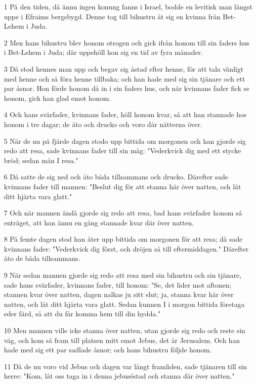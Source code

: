 \par 1 På den tiden, då ännu ingen konung fanns i Israel, bodde en levitisk man längst uppe i Efraims bergsbygd. Denne tog till bihustru åt sig en kvinna från Bet-Lehem i Juda.
\par 2 Men hans bihustru blev honom otrogen och gick ifrån honom till sin faders hus i Bet-Lehem i Juda; där uppehöll hon sig en tid av fyra månader.
\par 3 Då stod hennes man upp och begav sig åstad efter henne, för att tala vänligt med henne och så föra henne tillbaka; och han hade med sig sin tjänare och ett par åsnor. Hon förde honom då in i sin faders hus, och när kvinnans fader fick se honom, gick han glad emot honom.
\par 4 Och hans svärfader, kvinnans fader, höll honom kvar, så att han stannade hos honom i tre dagar; de åto och drucko och voro där nätterna över.
\par 5 När de nu på fjärde dagen stodo upp bittida om morgonen och han gjorde sig redo att resa, sade kvinnans fader till sin måg: "Vederkvick dig med ett stycke bröd; sedan mån I resa."
\par 6 Då satte de sig ned och åto båda tillsammans och drucko. Därefter sade kvinnans fader till mannen: "Beslut dig för att stanna här över natten, och låt ditt hjärta vara glatt."
\par 7 Och när mannen ändå gjorde sig redo att resa, bad hans svärfader honom så enträget, att han ännu en gång stannade kvar där över natten.
\par 8 På femte dagen stod han åter upp bittida om morgonen för att resa; då sade kvinnans fader: "Vederkvick dig först, och dröjen så till eftermiddagen." Därefter åto de båda tillsammans.
\par 9 När sedan mannen gjorde sig redo att resa med sin bihustru och sin tjänare, sade hans svärfader, kvinnans fader, till honom: "Se, det lider mot aftonen; stannen kvar över natten, dagen nalkas ju sitt slut; ja, stanna kvar här över natten, och låt ditt hjärta vara glatt. Sedan kunnen I i morgon bittida företaga eder färd, så att du får komma hem till din hydda."
\par 10 Men mannen ville icke stanna över natten, utan gjorde sig redo och reste sin väg, och kom så fram till platsen mitt emot Jebus, det är Jerusalem. Och han hade med sig ett par sadlade åsnor; och hans bihustru följde honom.
\par 11 Då de nu voro vid Jebus och dagen var långt framliden, sade tjänaren till sin herre: "Kom, låt oss taga in i denna jebuséstad och stanna där över natten."

